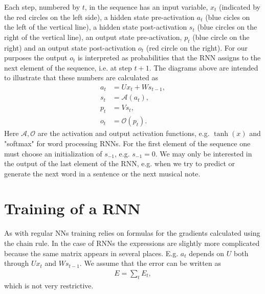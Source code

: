 \documentclass[12pt]{article}
\numberwithin{equation}{section}
\begin{document}
Each step, numbered by \(t\), in the sequence has an input variable, \(x_t\) (indicated by the red circles on the left side), a hidden state pre-activation \(a_t\) (blue cicles on the left of the vertical line), a hidden state post-activation \(s_t\) (blue circles on the right of the vertical line), an output state pre-activation, \(p_t\) (blue circle on the right) and an output state post-activation \(o_t\) (red circle on the right). For our purposes the output \(o_t\) is interpreted as probabilities that the RNN assigns to the next element of the sequence, i.e. at step \(t+1\). The diagrams above are intended to illustrate that these numbers are calculated as
\begin{align}
a_t &= Ux_t + Ws_{t-1},\\
s_t &= \mathcal{A}(a_t), \\
p_t &= Vs_t, \\
o_t &= \mathcal{O}(p_t).
\end{align}
Here \(\mathcal{A}, \mathcal{O}\) are the activation and output activation functions, e.g. \(\tanh(x)\) and "softmax" for word processing RNNs. For the first element of the sequence one must choose an initialization of \(s_{-1}\), e.g. \(s_{-1} = 0\). We may only be interested in the output of the last element of the RNN, e.g. when we try to predict or generate the next word in a sentence or the next musical note. 

\section{Training of a RNN}
As with regular NNs training relies on formulas for the gradients calculated using the chain rule. In the case of RNNs the expressions are slightly more complicated because the same matrix appears in several places. E.g. \(a_t\) depends on \(U\) both through \(Ux_t\) and \(Ws_{t-1}\). We assume that the error can be written as
\begin{align}
E = \sum_t E_t,
\end{align}
which is not very restrictive.
\end{document}
